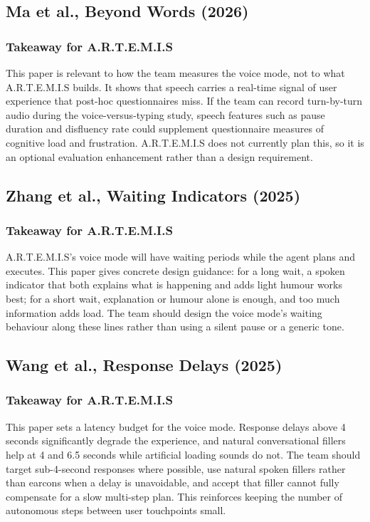 \documentclass[11pt,a4paper]{report}
\newcommand{\artemis}{A.R.T.E.M.I.S}
\begin{document}
\subsection{Ma et al., Beyond Words (2026)}

\subsubsection{Takeaway for \artemis{}}

This paper is relevant to how the team measures the voice mode, not to
what \artemis{} builds. It shows that speech carries a real-time signal
of user experience that post-hoc questionnaires miss. If the team can
record turn-by-turn audio during the voice-versus-typing study, speech
features such as pause duration and disfluency rate could supplement
questionnaire measures of cognitive load and frustration. \artemis{}
does not currently plan this, so it is an optional evaluation
enhancement rather than a design requirement.

\subsection{Zhang et al., Waiting Indicators (2025)}

\subsubsection{Takeaway for \artemis{}}

\artemis{}'s voice mode will have waiting periods while the agent plans
and executes. This paper gives concrete design guidance: for a long
wait, a spoken indicator that both explains what is happening and adds
light humour works best; for a short wait, explanation or humour alone
is enough, and too much information adds load. The team should design
the voice mode's waiting behaviour along these lines rather than using a
silent pause or a generic tone.

\subsection{Wang et al., Response Delays (2025)}

\subsubsection{Takeaway for \artemis{}}

This paper sets a latency budget for the voice mode. Response delays
above 4 seconds significantly degrade the experience, and natural
conversational fillers help at 4 and 6.5 seconds while artificial
loading sounds do not. The team should target sub-4-second responses
where possible, use natural spoken fillers rather than earcons when a
delay is unavoidable, and accept that filler cannot fully compensate for
a slow multi-step plan. This reinforces keeping the number of
autonomous steps between user touchpoints small.
\end{document}
